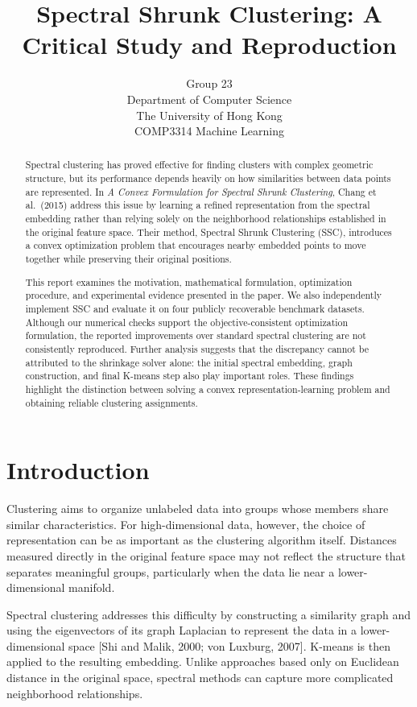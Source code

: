 \documentclass{article}
\title{Spectral Shrunk Clustering: A Critical Study and Reproduction}
\author{%
  Group 23 \\
  Department of Computer Science \\
  The University of Hong Kong \\
  COMP3314 Machine Learning
}
\begin{document}
\maketitle

\begin{abstract}
Spectral clustering has proved effective for finding clusters with complex geometric structure, but its performance depends heavily on how similarities between data points are represented. In \emph{A Convex Formulation for Spectral Shrunk Clustering}, Chang et al.\ (2015) address this issue by learning a refined representation from the spectral embedding rather than relying solely on the neighborhood relationships established in the original feature space. Their method, Spectral Shrunk Clustering (SSC), introduces a convex optimization problem that encourages nearby embedded points to move together while preserving their original positions.

This report examines the motivation, mathematical formulation, optimization procedure, and experimental evidence presented in the paper. We also independently implement SSC and evaluate it on four publicly recoverable benchmark datasets. Although our numerical checks support the objective-consistent optimization formulation, the reported improvements over standard spectral clustering are not consistently reproduced. Further analysis suggests that the discrepancy cannot be attributed to the shrinkage solver alone: the initial spectral embedding, graph construction, and final K-means step also play important roles. These findings highlight the distinction between solving a convex representation-learning problem and obtaining reliable clustering assignments.
\end{abstract}

\section{Introduction}

Clustering aims to organize unlabeled data into groups whose members share similar characteristics. For high-dimensional data, however, the choice of representation can be as important as the clustering algorithm itself. Distances measured directly in the original feature space may not reflect the structure that separates meaningful groups, particularly when the data lie near a lower-dimensional manifold.

Spectral clustering addresses this difficulty by constructing a similarity graph and using the eigenvectors of its graph Laplacian to represent the data in a lower-dimensional space [Shi and Malik, 2000; von Luxburg, 2007]. K-means is then applied to the resulting embedding. Unlike approaches based only on Euclidean distance in the original space, spectral methods can capture more complicated neighborhood relationships.
\end{document}
